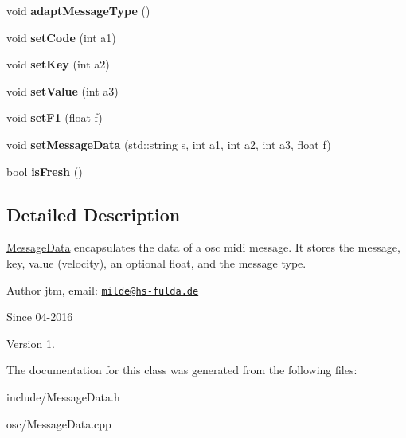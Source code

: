 \begin{DoxyCompactItemize}
\item 
void {\bfseries adapt\+Message\+Type} ()\hypertarget{classosc_1_1MessageData_a0f8ce5f6d5c4452e26656236ee7aefc3}{}\label{classosc_1_1MessageData_a0f8ce5f6d5c4452e26656236ee7aefc3}

\item 
void {\bfseries set\+Code} (int a1)\hypertarget{classosc_1_1MessageData_a8639583a844208ccae9568bb68d1e547}{}\label{classosc_1_1MessageData_a8639583a844208ccae9568bb68d1e547}

\item 
void {\bfseries set\+Key} (int a2)\hypertarget{classosc_1_1MessageData_a54a0ddfb44fba671ba243914b037e231}{}\label{classosc_1_1MessageData_a54a0ddfb44fba671ba243914b037e231}

\item 
void {\bfseries set\+Value} (int a3)\hypertarget{classosc_1_1MessageData_a24e273f0a4443505ccf6222405cfb567}{}\label{classosc_1_1MessageData_a24e273f0a4443505ccf6222405cfb567}

\item 
void {\bfseries set\+F1} (float f)\hypertarget{classosc_1_1MessageData_a94dce06ace95a93c075dbaf253e559fe}{}\label{classosc_1_1MessageData_a94dce06ace95a93c075dbaf253e559fe}

\item 
void {\bfseries set\+Message\+Data} (std\+::string s, int a1, int a2, int a3, float f)\hypertarget{classosc_1_1MessageData_a9eb7741e4216075b0e03c554d83e35ae}{}\label{classosc_1_1MessageData_a9eb7741e4216075b0e03c554d83e35ae}

\item 
bool {\bfseries is\+Fresh} ()\hypertarget{classosc_1_1MessageData_a169f4e7ec5a0eb896cfccd8186b5fe8d}{}\label{classosc_1_1MessageData_a169f4e7ec5a0eb896cfccd8186b5fe8d}

\end{DoxyCompactItemize}


\subsection{Detailed Description}
\hyperlink{classosc_1_1MessageData}{Message\+Data} encapsulates the data of a osc midi message. It stores the message, key, value (velocity), an optional float, and the message type.

\begin{DoxyAuthor}{Author}
jtm, email\+:  \href{mailto:milde@hs-fulda.de}{\tt milde@hs-\/fulda.\+de} 
\end{DoxyAuthor}
\begin{DoxySince}{Since}
04-\/2016 
\end{DoxySince}
\begin{DoxyVersion}{Version}
1. 
\end{DoxyVersion}


The documentation for this class was generated from the following files\+:\begin{DoxyCompactItemize}
\item 
include/Message\+Data.\+h\item 
osc/Message\+Data.\+cpp\end{DoxyCompactItemize}
